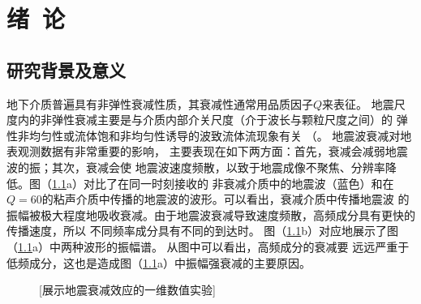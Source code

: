 


\newcommand{\citeA}[2]{\citeauthor{#1}\cite{#1}}

\chapter{绪~论}

\section{研究背景及意义}
地下介质普遍具有非弹性衰减性质，其衰减性通常用品质因子$Q$来表征。
地震尺度内的非弹性衰减主要是与介质内部介关尺度（介于波长与颗粒尺度之间）的
弹性非均匀性或流体饱和非均匀性诱导的波致流体流现象有关
（\citeA{pride:2003}，\citeA{muller:2010}）。
地震波衰减对地表观测数据有非常重要的影响，
主要表现在如下两方面：首先，衰减会减弱地震波的振；其次，衰减会使
地震波速度频散，以致于地震成像不聚焦、分辨率降低。图（\ref{fig:spectral}a）对比了在同一时刻接收的
非衰减介质中的地震波（蓝色）和在$Q=60$的粘声介质中传播的地震波的波形。可以看出，衰减介质中传播地震波
的振幅被极大程度地吸收衰减。由于地震波衰减导致速度频散，高频成分具有更快的传播速度，所以
不同频率成分具有不同的到达时。
图（\ref{fig:spectral}b）对应地展示了图（\ref{fig:spectral}a）中两种波形的振幅谱。
从图中可以看出，高频成分的衰减要
远远严重于低频成分，这也是造成图（\ref{fig:spectral}a）中振幅强衰减的主要原因。

\begin{figure}[!htbp]
        \centering
        [展示地震衰减效应的一维数值实验]
        \label{fig:spectral}
\end{figure}

